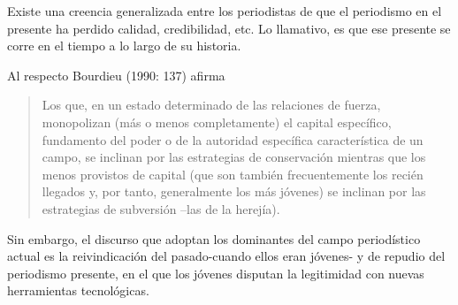 Existe una creencia generalizada entre los periodistas de que el periodismo en el presente ha perdido calidad, credibilidad, etc. Lo llamativo, es que ese presente se corre en el tiempo a lo largo de su historia.

Al respecto Bourdieu (1990: 137) afirma

\begin{quote}
Los que, en un estado determinado de las relaciones de fuerza, monopolizan (más o menos completamente) el capital específico, fundamento del poder o de la autoridad específica característica de un campo, se inclinan por las estrategias de conservación  mientras que los menos provistos de capital (que son también frecuentemente los recién llegados y, por tanto, generalmente los más jóvenes) se inclinan por las estrategias de subversión --las de la herejía).
\end{quote}

Sin embargo, el discurso que adoptan los dominantes del campo periodístico actual es la reivindicación del pasado-cuando ellos eran jóvenes- y de repudio del periodismo presente, en el que los jóvenes disputan la legitimidad con nuevas herramientas tecnológicas.

